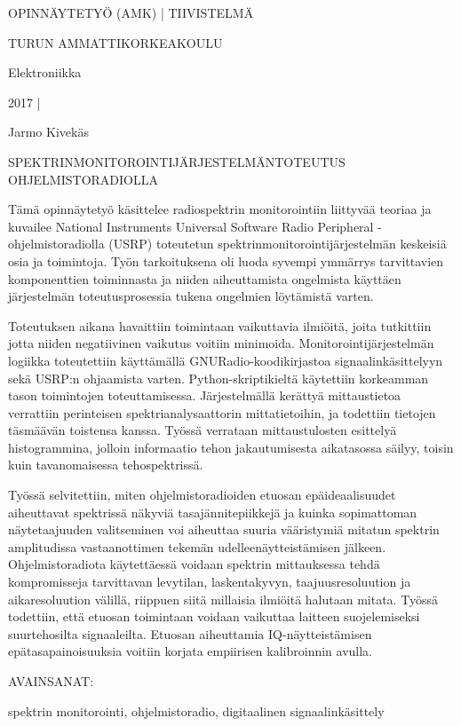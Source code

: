 

\clearpage


OPINNÄYTETYÖ (AMK) | TIIVISTELMÄ

TURUN AMMATTIKORKEAKOULU

Elektroniikka

2017 | \pageref{LastPage}


\vspace{7mm}
{\Large Jarmo Kivekäs \par}

\vspace{7mm}
{\huge SPEKTRINMONITOROINTIJÄRJESTELMÄN\newline TOTEUTUS OHJELMISTORADIOLLA \par}

\vspace{7mm}


Tämä opinnäytetyö käsittelee radiospektrin monitorointiin liittyvää teoriaa ja kuvailee National Instruments Universal Software Radio Peripheral -ohjelmistoradiolla (USRP) toteutetun spektrinmonitorointijärjestelmän keskeisiä osia ja toimintoja.
Työn tarkoituksena oli luoda syvempi ymmärrys tarvittavien komponenttien toiminnasta ja niiden aiheuttamista ongelmista käyttäen järjestelmän toteutusprosessia tukena ongelmien löytämistä varten.

Toteutuksen aikana havaittiin toimintaan vaikuttavia ilmiöitä, joita tutkittiin jotta niiden negatiivinen vaikutus voitiin minimoida.
Monitorointijärjestelmän logiikka toteutettiin käyttämällä GNURadio-koodikirjastoa signaalinkäsittelyyn sekä USRP:n ohjaamista varten.
Python-skriptikieltä käytettiin korkeamman tason toimintojen toteuttamisessa.
Järjestelmällä kerättyä mittaustietoa verrattiin perinteisen spektrianalysaattorin mittatietoihin, ja todettiin tietojen täsmäävän toistensa kanssa.
Työssä verrataan mittaustulosten esittelyä histogrammina, jolloin informaatio tehon jakautumisesta aikatasossa säilyy, toisin kuin tavanomaisessa tehospektrissä.

Työssä selvitettiin, miten ohjelmistoradioiden etuosan epäideaalisuudet aiheuttavat spektrissä näkyviä tasajännitepiikkejä ja kuinka sopimattoman näytetaajuuden valitseminen voi aiheuttaa suuria vääristymiä mitatun spektrin amplitudissa vastaanottimen tekemän udelleenäytteistämisen jälkeen.
Ohjelmistoradiota käytettäessä voidaan spektrin mittauksessa tehdä kompromisseja tarvittavan levytilan, laskentakyvyn, taajuusresoluution ja aikaresoluution välillä, riippuen siitä millaisia ilmiöitä halutaan mitata.
Työssä todettiin, että etuosan toimintaan voidaan vaikuttaa laitteen suojelemiseksi suurtehosilta signaaleilta.
Etuosan aiheuttamia IQ-näytteistämisen epätasapainoisuuksia voitiin korjata empiirisen kalibroinnin avulla.





\vspace{10mm}

AVAINSANAT:

spektrin monitorointi, ohjelmistoradio, digitaalinen signaalinkäsittely
